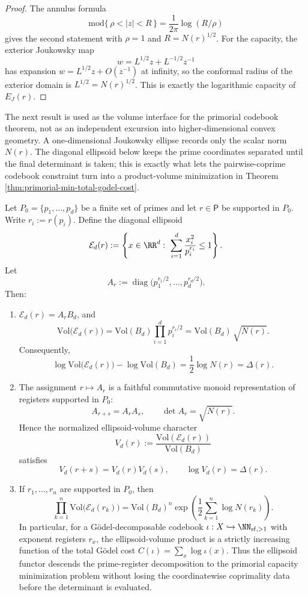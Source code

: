 \begin{proof}
The annulus formula
\[
\mathrm{mod}\{\,\rho<|z|<R\,\}=\frac{1}{2\pi}\log(R/\rho)
\]
gives the second statement with \(\rho=1\) and \(R=N(r)^{1/2}\). For the capacity, the exterior Joukowsky map
\[
w=L^{1/2}z+L^{-1/2}z^{-1}
\]
has expansion \(w=L^{1/2}z+O(z^{-1})\) at infinity, so the conformal radius of the exterior domain is \(L^{1/2}=N(r)^{1/2}\). This is exactly the logarithmic capacity of \(E_J(r)\).
\end{proof}

The next result is used as the volume interface for the primorial codebook theorem, not as an independent excursion into higher-dimensional convex geometry.  A one-dimensional Joukowsky ellipse records only the scalar norm \(N(r)\).  The diagonal ellipsoid below keeps the prime coordinates separated until the final determinant is taken; this is exactly what lets the pairwise-coprime codebook constraint turn into a product-volume minimization in Theorem \ref{thm:primorial-min-total-godel-cost}.

\begin{proposition}\label{prop:godel-ellipsoid-volume}
Let \(P_0=\{p_1,\dots,p_d\}\) be a finite set of primes and let \(r\in\mathsf P\) be supported in \(P_0\). Write \(r_i:=r(p_i)\). Define the diagonal ellipsoid
\[
\mathcal E_d(r):=\left\{x\in\RR^d:\ \sum_{i=1}^{d}\frac{x_i^2}{p_i^{r_i}}\le 1\right\}.
\]
Let
\[
A_r:=\operatorname{diag}\bigl(p_1^{r_1/2},\dots,p_d^{r_d/2}\bigr).
\]
Then:
\begin{enumerate}
  \item \(\mathcal E_d(r)=A_rB_d\), and
\[
\mathrm{Vol}\bigl(\mathcal E_d(r)\bigr)
=\mathrm{Vol}(B_d)\prod_{i=1}^{d}p_i^{r_i/2}
=\mathrm{Vol}(B_d)\,\sqrt{N(r)}.
\]
Consequently,
\[
\log\mathrm{Vol}\bigl(\mathcal E_d(r)\bigr)-\log\mathrm{Vol}(B_d)
=\frac12\log N(r)=\Delta(r).
\]

  \item The assignment \(r\mapsto A_r\) is a faithful commutative monoid representation of registers supported in \(P_0\):
  \[
  A_{r+s}=A_rA_s,
  \qquad
  \det A_r=\sqrt{N(r)}.
  \]
  Hence the normalized ellipsoid-volume character
  \[
  V_d(r):=\frac{\mathrm{Vol}(\mathcal E_d(r))}{\mathrm{Vol}(B_d)}
  \]
  satisfies
  \[
  V_d(r+s)=V_d(r)V_d(s),
  \qquad
  \log V_d(r)=\Delta(r).
  \]

  \item If \(r_1,
\dots,r_n\) are supported in \(P_0\), then
  \[
  \prod_{k=1}^{n}\mathrm{Vol}\bigl(\mathcal E_d(r_k)\bigr)
  =\mathrm{Vol}(B_d)^n\exp\!\left(\frac12\sum_{k=1}^{n}\log N(r_k)\right).
  \]
  In particular, for a G\"odel-decomposable codebook \(\iota:X\hookrightarrow\NN_{\mathrm{sf},>1}\) with exponent registers \(r_x\), the ellipsoid-volume product is a strictly increasing function of the total G\"odel cost \(C(\iota)=\sum_x\log\iota(x)\). Thus the ellipsoid functor descends the prime-register decomposition to the primorial capacity minimization problem without losing the coordinatewise coprimality data before the determinant is evaluated.
\end{enumerate}
\end{proposition}

